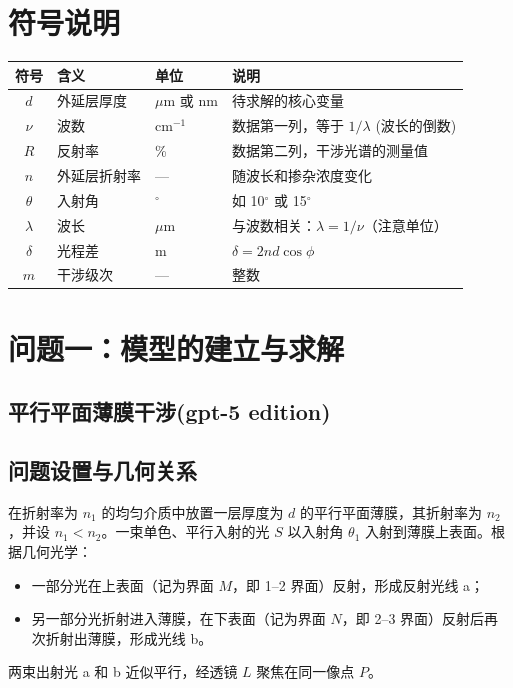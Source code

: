 \documentclass[withoutpreface,bwprint]{cumcmthesis} %
\begin{document}
\section{符号说明}

\begin{center}
    \begin{tabular}{clll}
        \toprule
        符号        & 含义     & 单位          & 说明                            \\
        \midrule
        $d$       & 外延层厚度  & $\mu$m 或 nm & 待求解的核心变量                      \\
        $\nu$     & 波数     & cm$^{-1}$   & 数据第一列，等于 $1/\lambda$ (波长的倒数)  \\
        $R$       & 反射率    & \%          & 数据第二列，干涉光谱的测量值                \\
        $n$       & 外延层折射率 & —           & 随波长和掺杂浓度变化                    \\
        $\theta$  & 入射角    & $^\circ$    & 如 10$^\circ$ 或 15$^\circ$     \\
        $\lambda$ & 波长     & $\mu$m      & 与波数相关：$\lambda = 1/\nu$（注意单位） \\
        $\delta$  & 光程差    & m           & $\delta = 2 n d \cos \phi$    \\
        $m$       & 干涉级次   & —           & 整数                            \\
        \bottomrule
    \end{tabular}
\end{center}


\section{问题一：模型的建立与求解}



\subsection{平行平面薄膜干涉(gpt-5 edition)}
\subsection{问题设置与几何关系}
在折射率为 \(n_1\) 的均匀介质中放置一层厚度为 \(d\) 的平行平面薄膜，其折射率为 \(n_2\)，并设 \(n_1<n_2\)。一束单色、平行入射的光 \(S\) 以入射角 \(\theta_1\) 入射到薄膜上表面。根据几何光学：
\begin{itemize}
    \item 一部分光在上表面（记为界面 \(M\)，即 1--2 界面）反射，形成反射光线 a；
    \item 另一部分光折射进入薄膜，在下表面（记为界面 \(N\)，即 2--3 界面）反射后再次折射出薄膜，形成光线 b。
\end{itemize}
两束出射光 a 和 b 近似平行，经透镜 \(L\) 聚焦在同一像点 \(P\)。
\end{document}
